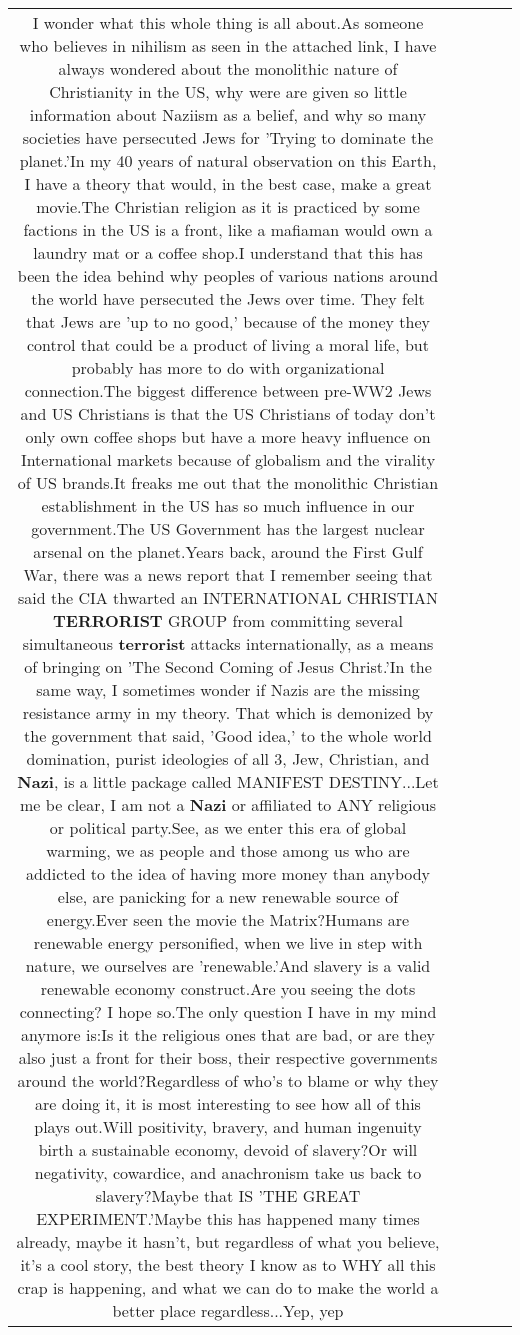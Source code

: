 \documentclass[11pt]{article}
\newlength\mylength
\begin{document}
\begin{center}
\begin{longtable}{|C{.65\mylength}|C{.30\mylength}|C{.12\mylength}|C{.12\mylength}|C{.12\mylength}|}
  \small I wonder what this whole thing is all about.As someone who believes in nihilism as seen in the attached link, I have always wondered about the monolithic nature of Christianity in the US, why were are given so little information about Naziism as a belief, and why so many societies have persecuted Jews for 'Trying to  dominate the planet.'In my 40 years of natural observation on this Earth, I have a theory that would, in the best case, make a great movie.The Christian religion as it is practiced by some factions in the US is a front, like a mafiaman would own a laundry mat or a coffee shop.I understand that this has been the idea behind why peoples of various nations around the world have persecuted the Jews over time. They felt that Jews are 'up to no good,' because of the money they control that could be a product of living a moral life, but probably has more to do with organizational connection.The biggest difference between pre-WW2 Jews and US Christians is that the US Christians of today don't only own coffee shops but have a more heavy influence on International markets because of globalism and the virality of US brands.It freaks me out that the monolithic Christian establishment in the US has so much influence in our government.The US Government has the largest nuclear arsenal on the planet.Years back, around the First Gulf War, there was a news report that I remember seeing that said the CIA thwarted an INTERNATIONAL CHRISTIAN \textbf{TERRORIST} GROUP from committing several simultaneous \textbf{terrorist} attacks internationally, as a means of bringing on 'The Second Coming of Jesus Christ.'In the same way, I sometimes wonder if Nazis are the missing resistance army in my theory. That which is demonized by the government that said, 'Good idea,' to the whole world domination, purist ideologies of all 3, Jew, Christian, and \textbf{Nazi}, is a little package called MANIFEST DESTINY...Let me be clear, I am not a \textbf{Nazi} or affiliated to ANY religious or political party.See, as we enter this era of global warming, we as people and those among us who are addicted to the idea of having more money than anybody else, are panicking for a new renewable source of energy.Ever seen the movie the Matrix?Humans are renewable energy personified, when we live in step with nature, we ourselves are 'renewable.'And slavery is a valid renewable economy construct.Are you seeing the dots connecting? I hope so.The only question I have in my mind anymore is:Is it the religious ones that are bad, or are they also just a front for their boss, their respective governments around the world?Regardless of who's to blame or why they are doing it, it is most interesting to see how all of this plays out.Will positivity, bravery, and human ingenuity birth a sustainable economy, devoid of slavery?Or will negativity, cowardice, and anachronism take us back to slavery?Maybe that IS 'THE GREAT EXPERIMENT.'Maybe this has happened many times already, maybe it hasn't, but regardless of what you believe, it's a cool story, the best theory I know as to WHY all this crap is happening, and what we can do to make the world a better place regardless...Yep, yep 
\end{longtable}
\end{center}
\end{document}
